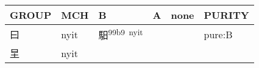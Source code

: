 \documentclass[14pt,a4paper]{scrartcl}
\begin{document}
\begin{longtable}[c]{@{}llllll@{}}
\toprule
\begin{minipage}[b]{0.14\columnwidth}\raggedright\strut
GROUP
\strut\end{minipage} &
\begin{minipage}[b]{0.14\columnwidth}\raggedright\strut
MCH
\strut\end{minipage} &
\begin{minipage}[b]{0.14\columnwidth}\raggedright\strut
B
\strut\end{minipage} &
\begin{minipage}[b]{0.14\columnwidth}\raggedright\strut
A
\strut\end{minipage} &
\begin{minipage}[b]{0.14\columnwidth}\raggedright\strut
none
\strut\end{minipage} &
\begin{minipage}[b]{0.14\columnwidth}\raggedright\strut
PURITY
\strut\end{minipage}\tabularnewline
\midrule
\endhead
\begin{minipage}[t]{0.14\columnwidth}\raggedright\strut
曰
\strut\end{minipage} &
\begin{minipage}[t]{0.14\columnwidth}\raggedright\strut
nyit
\strut\end{minipage} &
\begin{minipage}[t]{0.14\columnwidth}\raggedright\strut
馹\textsuperscript{99b9~nyit}
\strut\end{minipage} &
\begin{minipage}[t]{0.14\columnwidth}\raggedright\strut
\strut\end{minipage} &
\begin{minipage}[t]{0.14\columnwidth}\raggedright\strut
\strut\end{minipage} &
\begin{minipage}[t]{0.14\columnwidth}\raggedright\strut
pure:B
\strut\end{minipage}\tabularnewline
\begin{minipage}[t]{0.14\columnwidth}\raggedright\strut
圼
\strut\end{minipage} &
\begin{minipage}[t]{0.14\columnwidth}\raggedright\strut
nyit
\strut\end{minipage} &
\begin{minipage}[t]{0.14\columnwidth}\raggedright\strut
\strut\end{minipage} &
\begin{minipage}[t]{0.14\columnwidth}\raggedright\strut

\end{minipage}
\end{longtable}
\end{document}
